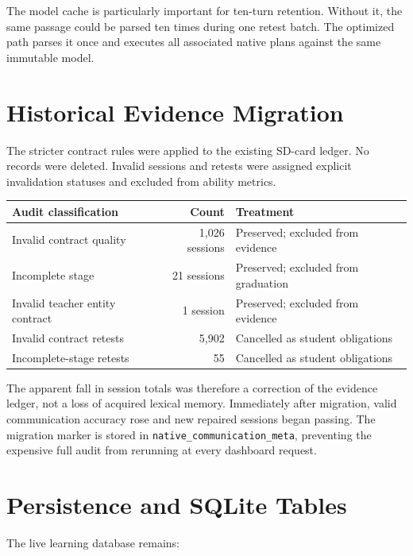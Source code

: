 \documentclass[11pt,a4paper]{article}
\begin{document}
The model cache is particularly important for ten-turn retention.  Without it, the same passage
could be parsed ten times during one retest batch.  The optimized path parses it once and executes
all associated native plans against the same immutable model.

\section{Historical Evidence Migration}

The stricter contract rules were applied to the existing SD-card ledger.  No records were
deleted.  Invalid sessions and retests were assigned explicit invalidation statuses and excluded
from ability metrics.

\begin{longtable}{p{}r p{}}
\toprule
Audit classification & Count & Treatment \\
\midrule
Invalid contract quality & 1,026 sessions & Preserved; excluded from evidence \\
Incomplete stage & 21 sessions & Preserved; excluded from graduation \\
Invalid teacher entity contract & 1 session & Preserved; excluded from evidence \\
Invalid contract retests & 5,902 & Cancelled as student obligations \\
Incomplete-stage retests & 55 & Cancelled as student obligations \\
\bottomrule
\end{longtable}

The apparent fall in session totals was therefore a correction of the evidence ledger, not a loss
of acquired lexical memory.  Immediately after migration, valid communication accuracy rose and
new repaired sessions began passing.  The migration marker is stored in
\texttt{native\_communication\_meta}, preventing the expensive full audit from rerunning at every
dashboard request.

\section{Persistence and SQLite Tables}

The live learning database remains:

\begin{center}
\end{center}
\end{document}
